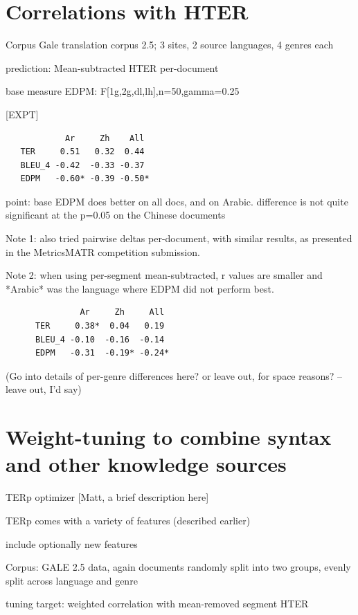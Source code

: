 \documentclass{kluwer}    %
\begin{document}
\begin{article}
\begin{itemize}
\end{itemize}

\section{Correlations with HTER}
\label{sec:hter1}
  Corpus
    Gale translation corpus 2.5; 3 sites, 2 source languages, 4 genres each

  prediction:
    Mean-subtracted HTER per-document

  base measure EDPM: F[1g,2g,dl,lh],n=50,gamma=0.25

  [EXPT]
\begin{verbatim}
            Ar     Zh    All
   TER     0.51   0.32  0.44
   BLEU_4 -0.42  -0.33 -0.37
   EDPM   -0.60* -0.39 -0.50*
\end{verbatim}
  point: base EDPM does better on all docs, and on Arabic. difference
  is not quite significant at the p=0.05 on the Chinese documents

  Note 1: also tried pairwise deltas per-document, with similar
  results, as presented in the MetricsMATR competition submission.

  Note 2: when using per-segment mean-subtracted, r values are smaller
  and *Arabic* was the language where EDPM did not perform best.

\begin{verbatim}
               Ar     Zh     All
      TER     0.38*  0.04   0.19
      BLEU_4 -0.10  -0.16  -0.14
      EDPM   -0.31  -0.19* -0.24*
\end{verbatim}

  (Go into details of per-genre differences here? or leave out, for
  space reasons? -- leave out, I'd say)

\section{Weight-tuning to combine syntax and other knowledge sources}
\label{sec:hter2}

TERp optimizer [Matt, a brief description here]

TERp comes with a variety of features (described earlier)

include optionally new features

Corpus: GALE 2.5 data, again documents randomly split into two groups,
evenly split across language and genre

tuning target: weighted correlation with mean-removed segment HTER


\end{article}
\end{document}
